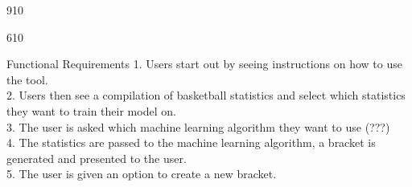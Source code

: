 \documentclass[letterpaper, 10pt,titlepage]{article}
\begin{document}
\begin{flushleft}
\begin{PstGanttChart}[unit=2,TaskOutsideLabelMaxSize=3.8, ChartModulo,ChartModuloValue=11, ChartStartInterval=0,ChartShowIntervals]{9}{10}

\end{PstGanttChart}

\vspace{15mm} %

\begin{PstGanttChart}[unit=2,TaskOutsideLabelMaxSize=3.8, ChartModulo,ChartModuloValue=11, ChartStartInterval=0,ChartShowIntervals]{6}{10} 



\end{PstGanttChart}

\end{flushleft}


\newpage


\begin{section}{Functional Requirements}
1.       Users start out by seeing instructions on how to use the tool. \\
2.       Users then see a compilation of basketball statistics and select which statistics they want to train their model on. \\
3.   	The user is asked which machine learning algorithm they want to use (???) \\
4.       The statistics are passed to the machine learning algorithm, a bracket is generated and presented to the user. \\
5.       The user is given an option to create a new bracket. \\


\end{section}
\end{document}
